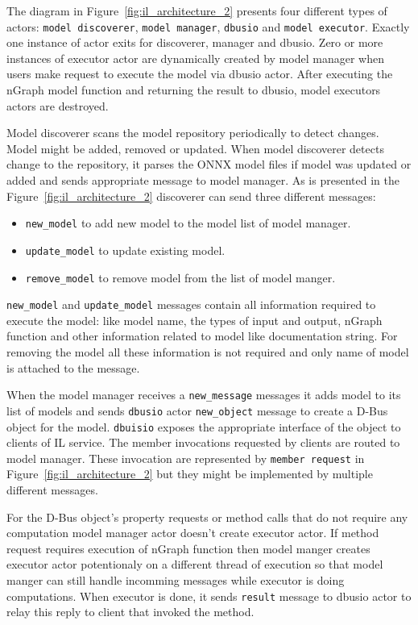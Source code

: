\documentclass[english, 12pt, a4paper, elec, utf8, online]{aaltothesis}
\begin{document}
The diagram in Figure~\ref{fig:il_architecture_2} presents four different types of actors: \texttt{model discoverer}, \texttt{model manager}, \texttt{dbusio} and \texttt{model executor}. Exactly one instance of actor exits for discoverer, manager and dbusio. Zero or more instances of executor actor are dynamically created by model manager when users make request to execute the model via dbusio actor. After executing the nGraph model function and returning the result to dbusio, model executors actors are destroyed.         

Model discoverer scans the model repository periodically to detect changes. Model might be added, removed or updated. When model discoverer detects change to the repository, it parses the ONNX model files if model was updated or added and sends appropriate message to model manager. As is presented in the Figure~\ref{fig:il_architecture_2} discoverer can send three different messages:
\begin{itemize}
\item \texttt{new\_model} to add new model to the model list of model manager.
\item \texttt{update\_model} to update existing model.
\item \texttt{remove\_model} to remove model from the list of model manger.  
\end{itemize}

\texttt{new\_model} and \texttt{update\_model} messages contain all information required to execute the model: like model name, the types of input and output, nGraph function and other information related to model like documentation string. For removing the model all these information is not required and only name of model is attached to the message. 

When the model manager receives a \texttt{new\_message} messages it adds model to its list of models and sends \texttt{dbusio} actor \texttt{new\_object} message to create a D-Bus object for the model. \texttt{dbuisio} exposes the appropriate interface of the object to clients of IL service. The member invocations requested by clients are routed to model manager. These invocation are represented by \texttt{member request} in Figure~\ref{fig:il_architecture_2} but they might be implemented by multiple different messages. 

For the D-Bus object's property requests or method calls that do not require any computation model manager actor doesn't create executor actor. If method request requires execution of nGraph function then model manger creates executor actor potentionaly on a different thread of execution so that model manger can still handle incomming messages while executor is doing computations. When executor is done, it sends \texttt{result} message to dbusio actor to relay this reply to client that invoked the method.                      
\newpage
\end{document}
